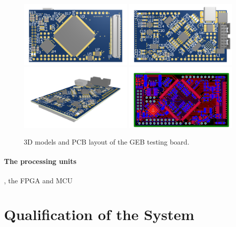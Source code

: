       \begin{figure}[h!]
        \centering
        \includegraphics[width=0.49\textwidth]{img/II-5-qualification/geb-3d-0.png}
        \includegraphics[width=0.49\textwidth]{img/II-5-qualification/geb-3d-1.png}
        \vspace*{0.3cm}
        \includegraphics[width=0.49\textwidth]{img/II-5-qualification/geb-3d-2.png}
        \includegraphics[width=0.49\textwidth]{img/II-5-qualification/geb-pcb.png}
        \caption{3D models and PCB layout of the GEB testing board.}
        \label{fig:II-5-geb-pcb}
      \end{figure}

      \paragraph{The processing units}, the FPGA and MCU 

  \section{Qualification of the System}

